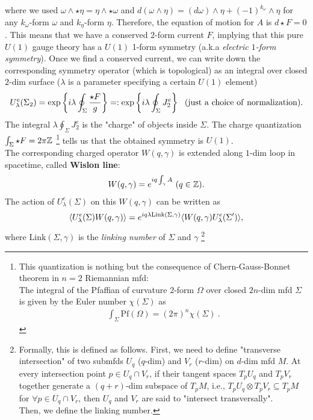 \documentclass{ltjsarticle}
\theoremstyle{mystyle} %
\numberwithin{equation}{section}
\begin{document}
where we used $\omega\wedge \star \eta = \eta\wedge \star \omega$ and 
$d(\omega\wedge \eta) = (d\omega)\wedge \eta + (-1)^{k_\omega} \wedge \eta$ for 
any $k_\omega$-form $\omega$ and $k_\eta$-form $\eta$. 
Therefore, the equation of motion for $A$ is $d\star F=0$. 
This means that we have a conserved $2$-form current $F$, implying that this pure $U(1)$ gauge theory has a $U(1)$ 1-form symmetry (a.k.a \textit{electric $1$-form symmetry}). 
Once we find a conserved current, we can write down the corresponding symmetry operator (which is topological) as an integral over closed $2$-dim surface 
($\lambda$ is a parameter specifying a certain $U(1)$ element)
\begin{align}
    U^{e}_{\lambda}(\Sigma_2) = \exp\left\{{i\lambda\oint_{\Sigma}\frac{\star F}{g}}\right\}=: \exp\left\{{i\lambda\oint_{\Sigma}J^e_2}\right\} ~~
    (\mathrm{just~a~choice~of~normalization}). 
    \label{electric1form}
\end{align}
The integral $\lambda\oint_{\Sigma}J^e_2$ is the "charge" of objects inside $\Sigma$. 
The charge quantization $\int_{\Sigma} \star F = 2\pi \mathbb{Z}$
\footnote{This quantization is nothing but the consequence of Chern-Gauss-Bonnet theorem in $n=2$ Riemannian mfd: \\
The integral of the Pfaffian of curvature $2$-form $\Omega$ over closed $2n$-dim mfd $\Sigma$ is given by the Euler number $\chi(\Sigma)$ as 
\begin{align}
    \int_{\Sigma} \mathrm{Pf}(\Omega) = (2\pi)^n \chi(\Sigma)~. 
\end{align}}
 tells us that the obtained symmetry is $U(1)$. \\
  The corresponding charged operator $W(q, \gamma)$ is extended along $1$-dim loop in spacetime, called \textbf{Wislon line}: 
  \begin{align}
    W(q, \gamma)=e^{iq\int_{\gamma}A}~(q\in \mathbb{Z}). 
  \end{align}
  The action of $U^{e}_\lambda(\Sigma)$ on this $W(q, \gamma)$ can be written as
  \begin{align}
    \langle{U^e_{\lambda}(\Sigma)W(q, \gamma)}\rangle=e^{iq\lambda\mathrm{Link}(\Sigma, \gamma)}\langle{W(q, \gamma)U^e_{\lambda}(\Sigma')}\rangle, 
    \label{ActionWlison} 
  \end{align}
  where $\mathrm{Link}(\Sigma, \gamma)$ is the \textit{linking number} of $\Sigma$ and $\gamma$
  \footnote{Formally, this is defined as follows. 
  First, we need to define "transverse intersection" of two submfds $U_q$ ($q$-dim) and $V_r$ ($r$-dim) on $d$-dim mfd $M$. 
  At every intersection point $p\in U_{q}\cap V_r$, if 
  their tangent spaces $T_p U_q$ and $T_p V_r$ together generate a $(q+r)$-dim subspace of $T_pM$, i.e., 
  $T_p U_q \otimes T_p V_r \subseteq T_p M$ for $\forall p\in U_{q}\cap V_r$, then 
  $U_q$ and $V_r$ are said to "intersect transversally". \\
   Then, we define the linking number. }
\end{document}
